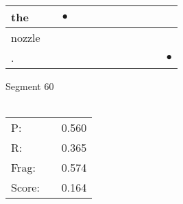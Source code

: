 \documentclass[landscape]{article}
\newcommand{\ssp}{\hspace{2pt}}
\newcommand{\mex}{\cellcolor{g}$\bullet$}
\begin{document}
\begin{tabular}{|l|p{10pt}|p{10pt}|p{10pt}|p{10pt}|p{10pt}|p{10pt}|p{10pt}|p{10pt}|p{10pt}|p{10pt}|p{10pt}|}
\hline
\ssp \cellcolor{ref1}the \ssp&\hspace{2pt}&\hspace{2pt}\mex&\hspace{2pt}&\hspace{2pt}&\hspace{2pt}&\hspace{2pt}&\hspace{2pt}&\hspace{2pt}&\hspace{2pt}&\hspace{2pt}&\hspace{2pt}\\
\hline
\ssp nozzle \ssp&\hspace{2pt}&\hspace{2pt}&\hspace{2pt}&\hspace{2pt}&\hspace{2pt}&\hspace{2pt}&\hspace{2pt}&\hspace{2pt}&\hspace{2pt}&\hspace{2pt}&\hspace{2pt}\\
\hline
\ssp \cellcolor{ref10}. \ssp&\hspace{2pt}&\hspace{2pt}&\hspace{2pt}&\hspace{2pt}&\hspace{2pt}&\hspace{2pt}&\hspace{2pt}&\hspace{2pt}&\hspace{2pt}&\hspace{2pt}&\hspace{2pt}\mex\\
\hline
\end{tabular}

\vspace{6pt}
\noindent Segment 60\\\\
\noindent\begin{tabular}{lm{12pt}r}
\hline
P:&&0.560\\
R:&&0.365\\
Frag:&&0.574\\
Score:&&0.164\\
\end{tabular}
\end{document}
